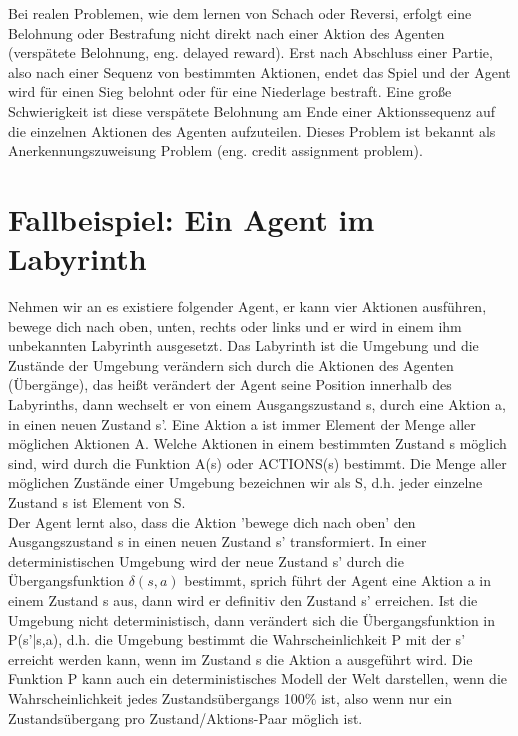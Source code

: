 Bei realen Problemen, wie dem lernen von Schach oder Reversi, erfolgt eine Belohnung oder Bestrafung nicht direkt nach einer Aktion des Agenten (verspätete Belohnung, eng. delayed reward). Erst nach Abschluss einer Partie, also nach einer Sequenz von bestimmten Aktionen, endet das Spiel und der Agent wird für einen Sieg belohnt oder für eine Niederlage bestraft. Eine große Schwierigkeit ist diese verspätete Belohnung am Ende einer Aktionssequenz auf die einzelnen Aktionen des Agenten aufzuteilen. Dieses Problem ist bekannt als Anerkennungszuweisung Problem (eng. credit assignment problem). \\

\section{Fallbeispiel: Ein Agent im Labyrinth}
Nehmen wir an es existiere folgender Agent, er kann vier Aktionen ausführen, bewege dich nach oben, unten, rechts oder links und er wird in einem ihm unbekannten Labyrinth ausgesetzt. Das Labyrinth ist die Umgebung und die Zustände der Umgebung verändern sich durch die Aktionen des Agenten (Übergänge), das heißt verändert der Agent seine Position innerhalb des Labyrinths, dann wechselt er von einem Ausgangszustand s, durch eine Aktion a, in einen neuen Zustand s'. Eine Aktion a ist immer Element der Menge aller möglichen Aktionen A. Welche Aktionen in einem bestimmten Zustand s möglich sind, wird durch die Funktion A(s) oder ACTIONS(s) bestimmt. Die Menge aller möglichen Zustände einer Umgebung bezeichnen wir als S, d.h. jeder einzelne Zustand s ist Element von S.\\

Der Agent lernt also, dass die Aktion 'bewege dich nach oben' den Ausgangszustand s in einen neuen Zustand s' transformiert. In einer deterministischen Umgebung wird der neue Zustand s' durch die Übergangsfunktion $\delta(s, a)$ bestimmt, sprich führt der Agent eine Aktion a in einem Zustand s aus, dann wird er definitiv den Zustand s' erreichen. Ist die Umgebung nicht deterministisch, dann verändert sich die Übergangsfunktion in P(s'|s,a), d.h. die Umgebung bestimmt die Wahrscheinlichkeit P mit der s' erreicht werden kann, wenn im Zustand s die Aktion a ausgeführt wird. Die Funktion P kann auch ein deterministisches Modell der Welt darstellen, wenn die Wahrscheinlichkeit jedes Zustandsübergangs 100\% ist, also wenn nur ein Zustandsübergang pro Zustand/Aktions-Paar möglich ist. \\

